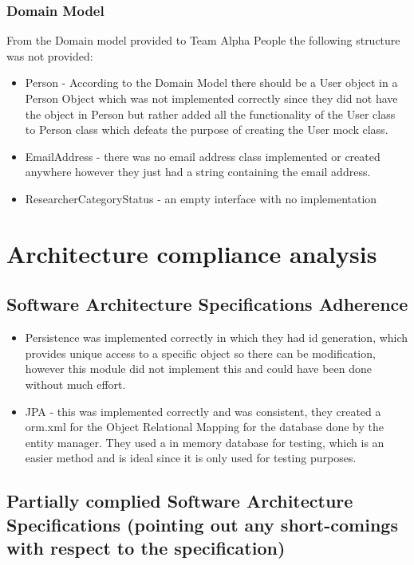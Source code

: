 \documentclass{article}
\begin{document}
\subsubsection{Domain Model}
From the Domain model provided to Team Alpha People the following structure was not provided:
\begin{itemize}
	\item Person - According to the Domain Model there should be a User object in a Person Object which was not implemented correctly since they did not have the object in Person but rather added all the functionality of the User class to Person class which defeats the purpose of creating the User mock class.
	\item EmailAddress - there was no email address class implemented or created anywhere however they just had a string containing the email address.
	\item ResearcherCategoryStatus - an empty interface with no implementation
\end{itemize}
\newpage
\section{Architecture compliance analysis}
\subsection{Software Architecture Specifications Adherence}
\begin{itemize}
	
	\item Persistence was implemented correctly in which they had id generation, which provides unique access to a specific object so there can be modification, however this module did not implement this and could have been done without much effort. 
	\item JPA - this was implemented correctly and was consistent, they created a orm.xml for the Object Relational Mapping for the database done by the entity manager. They used a in memory database for testing, which is an easier method and is ideal since it is only used for testing purposes.
	
\end{itemize}

\subsection{Partially complied Software Architecture Specifications (pointing out any short-comings with respect to the specification)}
\end{document}
